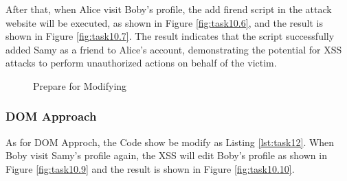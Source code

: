 \documentclass[a4paper,11pt]{article}
\begin{document}
After that, when Alice visit Boby's profile, the add firend script in the attack website will be executed, as shown in Figure \ref{fig:task10.6}, and the result is shown in Figure \ref{fig:task10.7}. The result indicates that the script successfully added Samy as a friend to Alice's account, demonstrating the potential for XSS attacks to perform unauthorized actions on behalf of the victim.
\begin{figure}[h]
    \centering
    \hfill
    \hfill
    \caption{Prepare for Modifying}\label{fig:task10-3}
\end{figure}

\subsubsection{DOM Approach}

As for DOM Approch, the Code show be modify as Listing \ref{lst:task12}. When Boby visit Samy's profile again, the XSS will edit Boby's profile as shown in Figure \ref{fig:task10.9} and the result is shown in Figure \ref{fig:task10.10}. 
\end{document}
